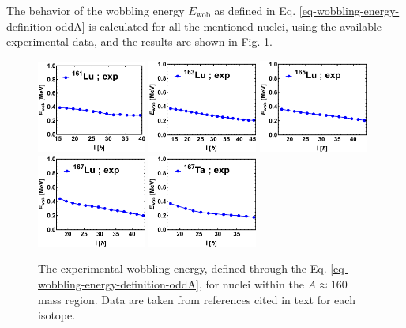 The behavior of the wobbling energy $E_\text{wob}$ as defined in Eq. \ref{eq-wobbling-energy-definition-oddA} is calculated for all the mentioned nuclei, using the available experimental data, and the results are shown in Fig. \ref{wobblers-exp-set3}.
\begin{figure}
    \centering
    \includegraphics[width=0.32\textwidth]{Chapters/Figures/wobblers/161Lu.pdf}
    \includegraphics[width=0.32\textwidth]{Chapters/Figures/wobblers/163Lu.pdf}
    \includegraphics[width=0.32\textwidth]{Chapters/Figures/wobblers/165Lu.pdf}
    \includegraphics[width=0.32\textwidth]{Chapters/Figures/wobblers/167Lu.pdf}
    \includegraphics[width=0.32\textwidth]{Chapters/Figures/wobblers/167Ta.pdf}
    \caption{The experimental wobbling energy, defined through the Eq. \ref{eq-wobbling-energy-definition-oddA}, for nuclei within the $A\approx 160$ mass region. Data are taken from references cited in text for each isotope.}
    \label{wobblers-exp-set3}
\end{figure}

